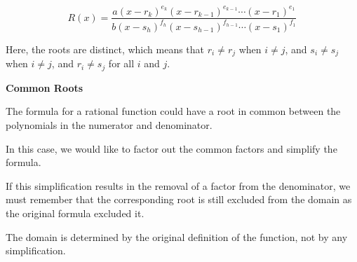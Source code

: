 \documentclass{ximera}
\begin{document}
\[  R(x)  = \frac{a (x - r_k)^{e_k} (x - r_{k-1})^{e_{k-1}} \cdots (x - r_1)^{e_1} }{b (x - s_h)^{f_h} (x - s_{h-1})^{f_{h-1}} \cdots (x - s_1)^{f_1}}            \]


Here, the roots are distinct, which means that  $r_i \ne r_j$ when $i \ne j$, and $s_i \ne s_j$ when $i \ne j$, and $r_i \ne s_j$ for all $i$ and $j$.



\begin{warning}   \textbf{\textcolor{red!70!black}{Common Roots}} 


The formula for a rational function could have a root in common between the polynomials in the numerator and denominator.

In this case, we would like to factor out the common factors and simplify the formula.

If this simplification results in the removal of a factor from the denominator, we must remember that the corresponding root is still excluded from the domain as the original formula excluded it.

The domain is determined by the original definition of the function, not by any simplification.

\end{warning}
\end{document}
